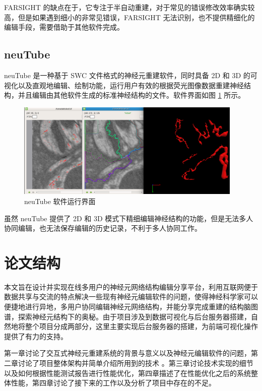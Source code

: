 FARSIGHT 的缺点在于，它专注于半自动重建，对于常见的错误修改效率确实较高，但是如果遇到细小的非常见错误，FARSIGHT 无法识别，也不提供精细化的编辑手段，需要借助于其他软件完成。

\subsection{neuTube}
neuTube 是一种基于 SWC 文件格式的神经元重建软件，同时具备 2D 和 3D 的可视化以及直观地编辑、绘制功能，运行用户有效的根据荧光图像数据重建神经结构，并且编辑由其他软件生成的标准神经结构的文件。软件界面如图 \ref{neutube} 所示。

\begin{figure}
\centering
\includegraphics[width=108mm]{images/neutube}
\caption{neuTube 软件运行界面}
\label{neutube}
\end{figure}

虽然 neuTube 提供了 2D 和 3D 模式下精细编辑神经结构的功能，但是无法多人协同编辑，也无法保存编辑的历史记录，不利于多人协同工作。

\section{论文结构}
本文旨在设计并实现在线多用户的神经元网络结构编辑分享平台，利用互联网便于数据共享与交流的特点解决一些现有神经元编辑软件的问题，使得神经科学家可以便捷地进行异地，多用户协同编辑神经元网络结构，并能分享完成重建的结构脑图谱，探索神经元结构下的奥秘。由于项目涉及到数据可视化与后台服务器搭建，自然地将整个项目分成两部分，这里主要实现后台服务器的搭建，为前端可视化操作提供了有力的支持。

第一章讨论了交互式神经元重建系统的背景与意义以及神经元编辑软件的问题，第二章讨论了项目整体架构并简单介绍所用到的技术
。第三章讨论技术实现的细节以及如何根据性能测试报告进行性能优化，第四章描述了在性能优化之后的系统整体性能，第四章讨论了接下来的工作以及分析了项目中存在的不足。

